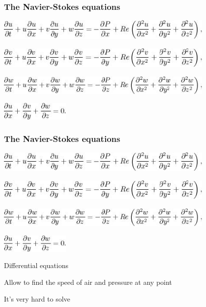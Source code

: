 \documentclass[default]{beamer}
\begin{document}
	\begin{frame}
		\frametitle{The Navier-Stokes equations}
		
		
		\centering
		\includegraphics[width=0.8\textwidth]{intro4.jpg}
		
		\includegraphics[width=0.8\textwidth]{intro4a.jpg}
		
		\includegraphics[width=0.8\textwidth]{intro4b.jpg}
		
		\includegraphics[width=0.25\textwidth]{intro4c.jpg}
	\end{frame}

	\begin{frame}
		\frametitle{The Navier-Stokes equations}
		
		
		\centering
		\includegraphics[width=0.8\textwidth]{intro4.jpg}
		
		\includegraphics[width=0.8\textwidth]{intro4a.jpg}
		
		\includegraphics[width=0.8\textwidth]{intro4b.jpg}
		
		\includegraphics[width=0.25\textwidth]{intro4c.jpg}
		
		\Large
		Differential equations
		
		Allow to find the speed of air and pressure at any point
		
		It's very hard to solve
	\end{frame}
\end{document}
